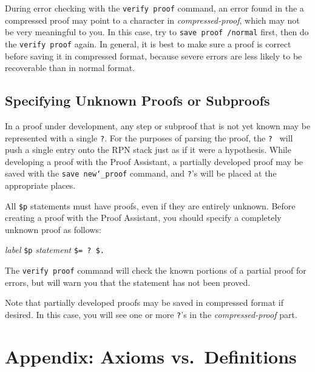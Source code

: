 During error checking with the \texttt{verify proof} command, an error
found in the a compressed proof may point to a character in {\em
compressed-proof}, which may not be very meaningful to you.  In this
case, try to \texttt{save proof /normal} first, then do the
\texttt{verify proof} again.  In general, it is best to make sure a
proof is correct before saving it in compressed format, because severe
errors are less likely to be recoverable than in normal format.

\subsection{Specifying Unknown Proofs or Subproofs}\label{unknown}

In a proof under development, any step or subproof that is not yet known
may be represented with a single \texttt{?}.  For the purposes of
parsing the proof, the \texttt{?}\ \index{\texttt{]}@\texttt{?}\ inside
proofs} will push a single entry onto the RPN stack just as if it were a
hypothesis.  While developing a proof with the Proof
Assistant, a partially developed proof may be
saved with the \texttt{save new{\char`\_}proof} command, and \texttt{?}'s will be placed at
the appropriate places.

All \texttt{\$p} statements must have
proofs, even if they are entirely unknown.  Before creating a proof with
the Proof Assistant, you should specify a completely unknown proof as
follows:
\begin{center}
  {\em label} \texttt{\$p} {\em statement} \texttt{\$= ?\ \$.}
\end{center}
\index{\texttt{]}@\texttt{?}\ inside proofs}

The \texttt{verify proof} command
will check the known portions of a partial proof for errors, but will
warn you that the statement has not been proved.

Note that partially developed proofs may be saved in compressed format
if desired.  In this case, you will see one or more \texttt{?}'s in the
{\em compressed-proof} part.

\section{Appendix:  Axioms vs.\ Definitions}\label{definitions}

